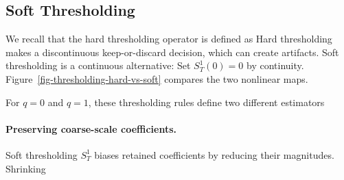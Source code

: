                                                      
\subsection{Soft Thresholding}

We recall that the hard thresholding operator is defined as
Hard thresholding makes a discontinuous keep-or-discard decision, which can create artifacts. Soft thresholding is a continuous alternative:
Set $S_T^1(0)=0$ by continuity. Figure~\ref{fig-thresholding-hard-vs-soft} compares the two nonlinear maps.


For $q=0$ and $q=1$, these thresholding rules define two different estimators



  
\paragraph{Preserving coarse-scale coefficients.}

Soft thresholding $S_T^1$ biases retained coefficients by reducing their magnitudes.
Shrinking
